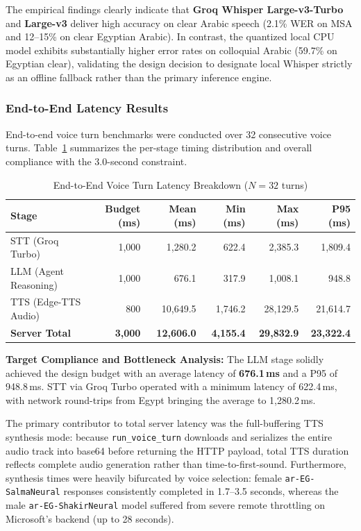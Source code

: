 The empirical findings clearly indicate that \textbf{Groq Whisper Large-v3-Turbo} and \textbf{Large-v3} deliver high accuracy on clear Arabic speech (2.1\% WER on MSA and 12--15\% on clear Egyptian Arabic). In contrast, the quantized local CPU model exhibits substantially higher error rates on colloquial Arabic (59.7\% on Egyptian clear), validating the design decision to designate local Whisper strictly as an offline fallback rather than the primary inference engine.

\subsubsection{End-to-End Latency Results}
End-to-end voice turn benchmarks were conducted over 32 consecutive voice turns. Table~\ref{tab:latency_summary} summarizes the per-stage timing distribution and overall compliance with the 3.0-second constraint.

\begin{table}[htbp]
\centering
\caption{End-to-End Voice Turn Latency Breakdown ($N=32$ turns)}
\label{tab:latency_summary}
\begin{tabular}{lrrrrr}
\toprule
\textbf{Stage} & \textbf{Budget (ms)} & \textbf{Mean (ms)} & \textbf{Min (ms)} & \textbf{Max (ms)} & \textbf{P95 (ms)} \\
\midrule
STT (Groq Turbo) & 1,000 & 1,280.2 & 622.4 & 2,385.3 & 1,809.4 \\
LLM (Agent Reasoning) & 1,000 & 676.1 & 317.9 & 1,008.1 & 948.8 \\
TTS (Edge-TTS Audio) & 800 & 10,649.5 & 1,746.2 & 28,129.5 & 21,614.7 \\
\midrule
\textbf{Server Total} & \textbf{3,000} & \textbf{12,606.0} & \textbf{4,155.4} & \textbf{29,832.9} & \textbf{23,322.4} \\
\bottomrule
\end{tabular}
\end{table}

\textbf{Target Compliance and Bottleneck Analysis:} 
The LLM stage solidly achieved the design budget with an average latency of \textbf{676.1\,ms} and a P95 of 948.8\,ms. STT via Groq Turbo operated with a minimum latency of 622.4\,ms, with network round-trips from Egypt bringing the average to 1,280.2\,ms. 

The primary contributor to total server latency was the full-buffering TTS synthesis mode: because \texttt{run\_voice\_turn} downloads and serializes the entire audio track into base64 before returning the HTTP payload, total TTS duration reflects complete audio generation rather than time-to-first-sound. Furthermore, synthesis times were heavily bifurcated by voice selection: female \texttt{ar-EG-SalmaNeural} responses consistently completed in 1.7--3.5 seconds, whereas the male \texttt{ar-EG-ShakirNeural} model suffered from severe remote throttling on Microsoft's backend (up to 28 seconds).

